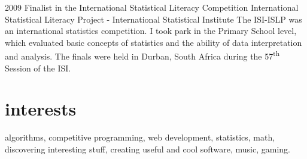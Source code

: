 \documentclass[]{friggeri-cv} %
\begin{document}
\begin{entrylist}


\entry
{2009}
{Finalist in the International Statistical Literacy Competition}
{International Statistical Literacy Project - International Statistical Institute}
{The ISI-ISLP was an international statistics competition. I took park in the Primary School level, which evaluated basic concepts of statistics and the ability of data interpretation and analysis. The finals were held in Durban, South Africa during the 57\textsuperscript{th} Session of the ISI.}


\end{entrylist}


\section{interests}

algorithms, competitive programming, web development, statistics, math, discovering interesting stuff, creating useful and cool software, music, gaming.
\end{document}
